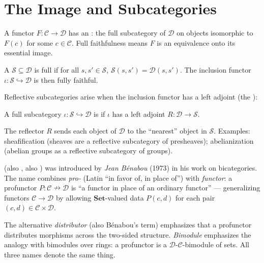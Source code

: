 \section{The Image and Subcategories}

A functor $F : \mathcal{C} \to \mathcal{D}$ has an : the
full subcategory of $\mathcal{D}$ on objects isomorphic to $F(c)$ for some
$c \in \mathcal{C}$. Full faithfulness means $F$ is an equivalence onto its
essential image.

\begin{definition}
A  $\mathcal{S} \subseteq \mathcal{D}$ is full if for all
$s, s' \in \mathcal{S}$, $\mathcal{S}(s, s') = \mathcal{D}(s, s')$. The inclusion
functor $\iota : \mathcal{S} \hookrightarrow \mathcal{D}$ is then fully faithful.
\end{definition}

Reflective subcategories arise when the inclusion functor has a left adjoint
(the ):

\begin{definition}
A full subcategory $\iota : \mathcal{S} \hookrightarrow \mathcal{D}$ is
 if $\iota$ has a left adjoint $R : \mathcal{D} \to \mathcal{S}$.
\end{definition}

The reflector $R$ sends each object of $\mathcal{D}$ to the ``nearest'' object
in $\mathcal{S}$. Examples: sheafification (sheaves are a reflective subcategory
of presheaves); abelianization (abelian groups as a reflective subcategory of groups).

\begin{nameorigin}
 (also , also ) was
introduced by \emph{Jean Bénabou} (1973) in his work on bicategories.
The name combines \emph{pro-} (Latin ``in favor of, in place of'') with
\emph{functor}: a profunctor $P : \mathcal{C} \nrightarrow \mathcal{D}$
is ``a functor in place of an ordinary functor'' — generalizing functors
$\mathcal{C} \to \mathcal{D}$ by allowing $\mathbf{Set}$-valued data
$P(c, d)$ for each pair $(c, d) \in \mathcal{C} \times \mathcal{D}$.

The alternative \emph{distributor} (also Bénabou's term) emphasizes
that a profunctor distributes morphisms across the two-sided structure.
\emph{Bimodule} emphasizes the analogy with bimodules over rings: a
profunctor is a $\mathcal{D}$-$\mathcal{C}$-bimodule of sets. All three
names denote the same thing.
\end{nameorigin}

